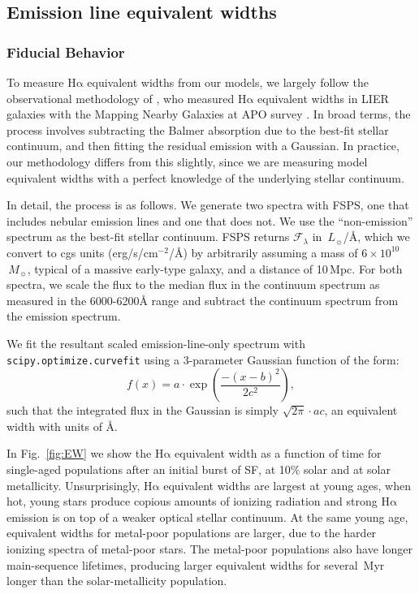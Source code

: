 \documentclass[preprint2]{aastex62}
\newcommand{\FSPS}{{\sc FSPS}\xspace}
\newcommand\Lsun{\ensuremath{\,L_{\sun}}\xspace}
\newcommand\Msun{\ensuremath{\,M_{\sun}}\xspace}
\newcommand{\ha}{\ensuremath{\mathrm{H\alpha}}\xspace}
\newcommand{\ang}{\ensuremath{\mbox{\AA}}\xspace}
\newcommand{\Myr}{$\,$Myr\xspace}
\begin{document}

\subsection{Emission line equivalent widths}\label{sec:stars:emis}
\subsubsection{Fiducial Behavior}\label{sec:stars:emis:fid}

To measure \ha equivalent widths from our models, we largely follow the observational methodology of \citet{Belfiore+2016}, who measured \ha equivalent widths in LIER galaxies with the Mapping Nearby Galaxies at APO survey \citep[MaNGA; ][]{Bundy+2015}. In broad terms, the process involves subtracting the Balmer absorption due to the best-fit stellar continuum, and then fitting the residual emission with a Gaussian. In practice, our methodology differs from this slightly, since we are measuring model equivalent widths with a perfect knowledge of the underlying stellar continuum.

In detail, the process is as follows. We generate two spectra with \FSPS, one that includes nebular emission lines and one that does not. We use the ``non-emission'' spectrum as the best-fit stellar continuum. \FSPS returns $\mathcal{F}_{\lambda}$ in \Lsun/\ang, which we convert to cgs units (erg/s/cm$^{-2}$/\ang) by arbitrarily assuming a mass of $6 \times 10^{10}$\Msun, typical of a massive early-type galaxy, and a distance of 10$\,$Mpc. For both spectra, we scale the flux to the median flux in the continuum spectrum as measured in the 6000-6200\ang range and subtract the continuum spectrum from the emission spectrum. 

We fit the resultant scaled emission-line-only spectrum with \texttt{scipy.optimize.curvefit} \citep{SciPy} using a 3-parameter Gaussian function of the form:
\begin{equation}
    f(x) = a \cdot \exp \left( \frac{-(x-b)^2}{2c^2} \right),
\end{equation}
such that the integrated flux in the Gaussian is simply $\sqrt{2\pi} \cdot ac$, an equivalent width with units of \ang.

In Fig.~\ref{fig:EW} we show the \ha equivalent width as a function of time for single-aged populations after an initial burst of SF, at 10\% solar and at solar metallicity. Unsurprisingly, \ha equivalent widths are largest at young ages, when hot, young stars produce copious amounts of ionizing radiation and strong \ha emission is on top of a weaker optical stellar continuum. At the same young age, equivalent widths for metal-poor populations are larger, due to the harder ionizing spectra of metal-poor stars. The metal-poor populations also have longer main-sequence lifetimes, producing larger equivalent widths for several \Myr longer than the solar-metallicity population.
\end{document}
